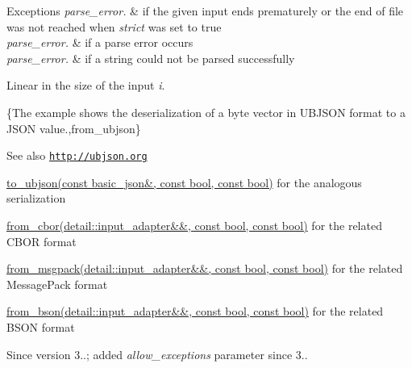 \begin{DoxyExceptions}{Exceptions}
{\em parse\+\_\+error.} & if the given input ends prematurely or the end of file was not reached when {\itshape strict} was set to true \\
\hline
{\em parse\+\_\+error.} & if a parse error occurs \\
\hline
{\em parse\+\_\+error.} & if a string could not be parsed successfully\\
\hline
\end{DoxyExceptions}
Linear in the size of the input {\itshape i}.

\{The example shows the deserialization of a byte vector in U\+B\+J\+S\+ON format to a J\+S\+ON value.,from\+\_\+ubjson\}

\begin{DoxySeeAlso}{See also}
\href{http://ubjson.org}{\tt http\+://ubjson.\+org} 

\hyperlink{classnlohmann_1_1basic__json_ae1ece6c2059114eac10873f13ef19185}{to\+\_\+ubjson(const basic\+\_\+json\&, const bool, const bool)} for the analogous serialization 

\hyperlink{classnlohmann_1_1basic__json_a1d568ba1bd6978d80db42aa76626e2cf}{from\+\_\+cbor(detail\+::input\+\_\+adapter\&\&, const bool, const bool)} for the related C\+B\+OR format 

\hyperlink{classnlohmann_1_1basic__json_a11458b7982adba51bc634f2f8c961e9b}{from\+\_\+msgpack(detail\+::input\+\_\+adapter\&\&, const bool, const bool)} for the related Message\+Pack format 

\hyperlink{classnlohmann_1_1basic__json_a0524486cd0b36a47448df882ec0d5e7b}{from\+\_\+bson(detail\+::input\+\_\+adapter\&\&, const bool, const bool)} for the related B\+S\+ON format
\end{DoxySeeAlso}
\begin{DoxySince}{Since}
version 3..; added {\itshape allow\+\_\+exceptions} parameter since 3.. 
\end{DoxySince}
